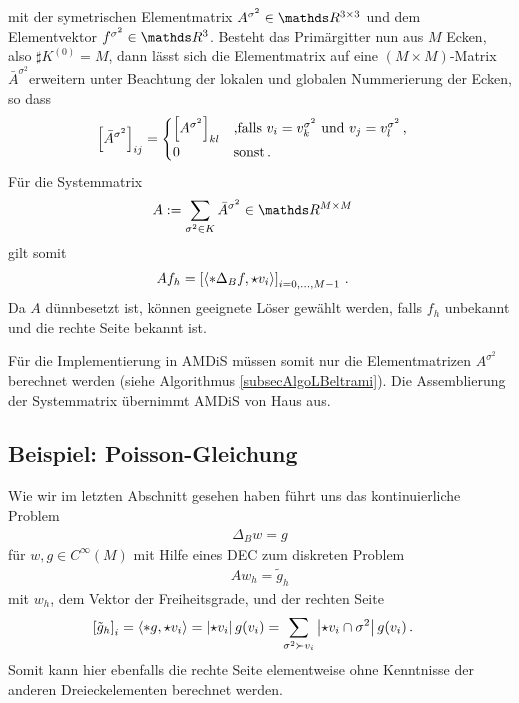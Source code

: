     mit der symetrischen Elementmatrix \( A^{\sigma^{2}} \in \R^{3 \times 3} \) 
    und dem Elementvektor \( f^{\sigma^{2}}\in\R^{3} \).
    Besteht das Primärgitter nun aus \( M \) Ecken, also \( \sharp K^{(0)} = M \),
    dann lässt sich die Elementmatrix auf eine \( (M\times M) \)-Matrix \( \bar{A}^{\sigma^{2}} \)erweitern 
    unter Beachtung
    der lokalen und globalen Nummerierung der Ecken, so dass
    \begin{align}
      \left[ \bar{A}^{\sigma^{2}} \right]_{ij}
        &= 
          \begin{cases}
            \left[ A^{\sigma^{2}} \right]_{kl} & \text{,falls } v_{i} = v^{\sigma^{2}}_{k}
                                                 \text{ und }   v_{j} = v^{\sigma^{2}}_{l} \,\text{,} \\
            0 & \text{sonst} \,\text{.}
          \end{cases}
    \end{align}
    Für die Systemmatrix
    \begin{align}
      A &:= \sum_{\sigma^{2}\in K} \bar{A}^{\sigma^{2}} \in \R^{M\times M}
    \end{align}
    gilt somit
    \begin{align}
      A f_{h} &= \left[ \left\langle *\Delta_{B} f, \star v_{i}  \right\rangle\right]_{i=0,\ldots,M-1} \,\text{.}
    \end{align}
    Da \( A \) dünnbesetzt ist, können geeignete Löser gewählt werden, 
    falls \( f_{h} \) unbekannt und die rechte Seite bekannt ist.

    Für die Implementierung in AMDiS müssen somit nur die Elementmatrizen \( A^{\sigma^{2}} \) berechnet
    werden (siehe Algorithmus \ref{subsecAlgoLBeltrami}). 
    Die Assemblierung der Systemmatrix übernimmt AMDiS von Haus aus. 
  
  \subsection{Beispiel: Poisson-Gleichung}
    Wie wir im letzten Abschnitt gesehen haben führt uns das kontinuierliche Problem
    \begin{align}
      \Delta_{B} w = g
    \end{align}
    für \( w,g \in C^{\infty}(M) \) mit Hilfe eines DEC zum diskreten Problem
    \begin{align}
      A w_{h} = \tilde{g}_{h}
    \end{align}
    mit \( w_{h} \), dem Vektor der Freiheitsgrade, und der rechten Seite
    \begin{align}
      \left[ \tilde{g}_{h} \right]_{i} &= \left\langle *g , \star v_{i} \right\rangle
            = \left| \star v_{i} \right| g(v_{i})
            = \sum_{\sigma^{2}\succ v_{i}} \left| \star v_{i} \cap \sigma^{2} \right| g(v_{i}) \,\text{.}
    \end{align}
    Somit kann hier ebenfalls die rechte Seite elementweise ohne Kenntnisse der anderen Dreieckelementen
    berechnet werden. 
    
